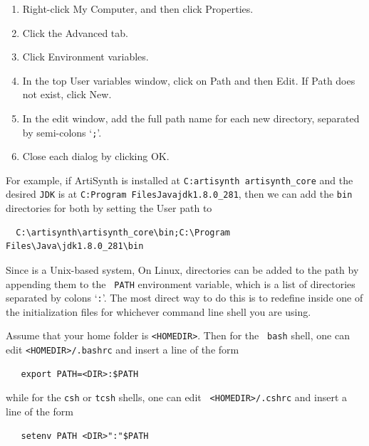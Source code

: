 \begin{enumerate}

\item Right-click {\sf My Computer}, and then click {\sf Properties}.

\item Click the {\sf Advanced} tab.

\item Click {\sf Environment variables}.

\item In the top {\sf User variables} window, click on {\sf Path} and 
then {\sf Edit}. If {\sf Path} does not exist, click {\sf New}.

\item In the edit window, add the full path name for each new directory,
separated by semi-colons `{\tt ;}'.

\item Close each dialog by clicking {\sf OK}.

\end{enumerate}

For example, if ArtiSynth is installed at {\tt C:\BKS artisynth\BKS
artisynth\_core} and the desired {\tt JDK} is at {\tt C:\BKS Program
Files\BKS Java\BKS jdk1.8.0\_281}, then we can add the {\tt bin}
directories for both by setting the User path to
\begin{verbatim}
  C:\artisynth\artisynth_core\bin;C:\Program Files\Java\jdk1.8.0_281\bin
\end{verbatim}

\fi %

\ifWindows\else %

\ifMacOS
Since \SYSTEM{} is a Unix-based system, 
\else\ifLinux
On Linux,
\fi %
\fi %
directories can be added to the path by appending them to the {\tt
PATH} environment variable, which is a list of directories separated
by colons `{\tt :}'. The most direct way to do this is to redefine
\PATH{} inside one of the initialization files for whichever
command line shell you are using.

Assume that your home folder is {\tt <HOMEDIR>}. Then for the {\tt
bash} shell, one can edit {\tt <HOMEDIR>/.bashrc} and insert a line of
the form
\begin{verbatim}
   export PATH=<DIR>:$PATH
\end{verbatim}
while for the {\tt csh} or {\tt tcsh} shells, one can edit {\tt
<HOMEDIR>/.cshrc} and insert a line of the form
\begin{verbatim}
   setenv PATH <DIR>":"$PATH
\end{verbatim}

